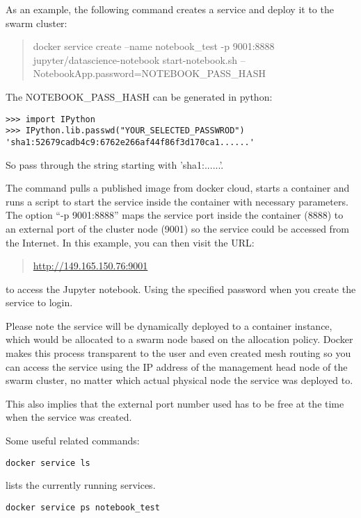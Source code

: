 As an example, the following command creates a service and deploy it to
the swarm cluster:

\begin{quote}
docker service create --name notebook\_test -p 9001:8888
jupyter/datascience-notebook start-notebook.sh
--NotebookApp.password=NOTEBOOK\_PASS\_HASH
\end{quote}

The NOTEBOOK\_PASS\_HASH can be generated in python:

\begin{verbatim}
>>> import IPython
>>> IPython.lib.passwd("YOUR_SELECTED_PASSWROD")
'sha1:52679cadb4c9:6762e266af44f86f3d170ca1......'
\end{verbatim}

So pass through the string starting with 'sha1:......'.

The command pulls a published image from docker cloud, starts a container and
runs a script to start the service inside the container with necessary
parameters. The option ``-p 9001:8888'' maps the service port inside the
container (8888) to an external port of the cluster node (9001) so the
service could be accessed from the Internet. In this example, you can
then visit the URL:

\begin{quote}
\url{http://149.165.150.76:9001}
\end{quote}

to access the Jupyter notebook. Using the specified password when you
create the service to login.

Please note the service will be dynamically deployed to a container
instance, which would be allocated to a swarm node based on the
allocation policy. Docker makes this process transparent to the user and
even created mesh routing so you can access the service using the IP
address of the management head node of the swarm cluster, no matter
which actual physical node the service was deployed to.

This also implies that the external port number used has to be free at
the time when the service was created.

Some useful related commands:


\begin{verbatim}
docker service ls
\end{verbatim}

lists the currently running services.

\begin{verbatim}
docker service ps notebook_test
\end{verbatim}

